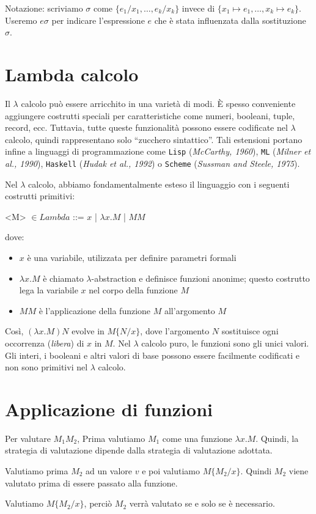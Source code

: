 Notazione: scriviamo $\sigma$ come $\{e_1/x_1, \ldots, e_k/x_k\}$ invece di
$\{x_1 \mapsto e_1, \ldots, x_k \mapsto e_k\}$. Useremo $e\sigma$ per indicare
l'espressione $e$ che è stata influenzata dalla sostituzione $\sigma$.
\section{Lambda calcolo}

Il $\lambda$ calcolo può essere arricchito in una varietà di modi.
È spesso conveniente aggiungere costrutti speciali per caratteristiche
come numeri, booleani, tuple, record, ecc. Tuttavia, tutte queste
funzionalità possono essere codificate nel $\lambda$ calcolo, quindi rappresentano
solo ``zucchero sintattico''. Tali estensioni portano infine a linguaggi
di programmazione come \texttt{Lisp} (\textit{McCarthy, 1960}),
\texttt{ML} (\textit{Milner et al., 1990}), \texttt{Haskell} (\textit{Hudak et al., 1992})
o \texttt{Scheme} (\textit{Sussman and Steele, 1975}).

Nel $\lambda$ calcolo, abbiamo fondamentalmente esteso il linguaggio con i seguenti
costrutti primitivi:

\begin{grammar}
    <M> $\in Lambda$ ::= $x$ | $\lambda x.M$ | $MM$
\end{grammar}

dove:

\begin{itemize}
    \item $x$ è una variabile, utilizzata per definire parametri formali
    \item $\lambda x.M$ è chiamato $\lambda$-abstraction e definisce funzioni anonime;
    questo costrutto lega la variabile $x$ nel corpo della funzione $M$
    \item $MM$ è l'applicazione della funzione $M$ all'argomento $M$
\end{itemize}

Così, $(\lambda x.M)N$ evolve in $M\{N/x\}$, dove l'argomento $N$ sostituisce
ogni occorrenza (\textit{libera}) di $x$ in $M$. Nel $\lambda$ calcolo puro,
le funzioni sono gli unici valori. Gli interi, i booleani e altri valori di
base possono essere facilmente codificati e non sono primitivi nel $\lambda$ calcolo.
\section{Applicazione di funzioni}
Per valutare $M_1 M_2$,
Prima valutiamo $M_1$ come una funzione $\lambda x.M$.
Quindi, la strategia di valutazione dipende dalla strategia di valutazione adottata.
\begin{tcolorbox}[title = Call by value]
    Valutiamo prima $M_2$ ad un valore $v$ e poi valutiamo $M\{M_2/x\}$. Quindi 
    $M_2$ viene valutato prima di essere passato alla funzione.
\end{tcolorbox}
\begin{tcolorbox}[title = Call by name]
    Valutiamo $M\{M_2/x\}$, perciò $M_2$ verrà valutato se e solo se è necessario.
\end{tcolorbox}

